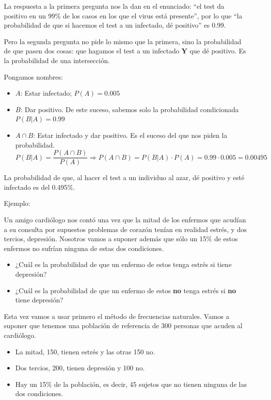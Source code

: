 \documentclass[
  spanish,
  letterpaper,
  DIV=11,
  numbers=noendperiod]{scrreprt}
\providecommand{\tightlist}{%
  \setlength{\itemsep}{0pt}\setlength{\parskip}{0pt}}
\begin{document}
\begin{tcolorbox}
La respuesta a la primera pregunta nos la dan en el enunciado: ``el test
da positivo en un 99\% de los casos en los que el virus está presente'',
por lo que ``la probabilidad de que si hacemos el test a un infectado,
dé positivo'' es 0.99.

Pero la segunda pregunta no pide lo mismo que la primera, sino la
probabilidad de que pasen dos cosas: que hagamos el test a un infectado
\textbf{Y} que dé positivo. Es la probabilidad de una intersección.

Pongamos nombres:

\begin{itemize}
\item
  \(A\): Estar infectado; \(P(A)=0.005\)
\item
  \(B\): Dar positivo. De este suceso, sabemos solo la probabilidad
  condicionada \(P(B|A)=0.99\)
\item
  \(A\cap B\): Estar infectado y dar positivo. Es el suceso del que nos
  piden la probabilidad. \[
  P(B|A)=\frac{P(A \cap B)}{P(A)}\Longrightarrow  P(A \cap B)=P(B|A)\cdot P(A)=0.99\cdot 0.005=0.00495
  \]
\end{itemize}

La probabilidad de que, al hacer el test a un individuo al azar, dé
positivo y esté infectado es del 0.495\%.

Ejemplo:

Un amigo cardiólogo nos contó una vez que la mitad de los enfermos que
acudían a su consulta por supuestos problemas de corazón tenían en
realidad estrés, y dos tercios, depresión. Nosotros vamos a suponer
además que sólo un 15\% de estos enfermos no sufrían ninguna de estas
dos condiciones.

\begin{itemize}
\tightlist
\item
  ¿Cuál es la probabilidad de que un enfermo de estos tenga estrés si
  tiene depresión?
\item
  ¿Cuál es la probabilidad de que un enfermo de estos \textbf{no} tenga
  estrés si \textbf{no} tiene depresión?
\end{itemize}

Esta vez vamos a usar primero el método de frecuencias naturales. Vamos
a suponer que tenemos una población de referencia de 300 personas que
acuden al cardiólogo.

\begin{itemize}
\item
  La mitad, 150, tienen estrés y las otras 150 no.
\item
  Dos tercios, 200, tienen depresión y 100 no.
\item
  Hay un 15\% de la población, es decir, 45 sujetos que no tienen
  ninguna de las dos condiciones.


\end{itemize}
\end{tcolorbox}
\end{document}
